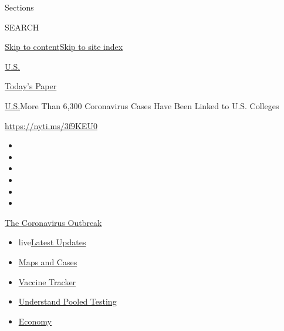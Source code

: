 Sections

SEARCH

\protect\hyperlink{site-content}{Skip to
content}\protect\hyperlink{site-index}{Skip to site index}

\href{https://www.nytimes.com/section/us}{U.S.}

\href{https://myaccount.nytimes.com/auth/login?response_type=cookie\&client_id=vi}{}

\href{https://www.nytimes.com/section/todayspaper}{Today's Paper}

\href{/section/us}{U.S.}\textbar{}More Than 6,300 Coronavirus Cases Have
Been Linked to U.S. Colleges

\url{https://nyti.ms/3f9KEU0}

\begin{itemize}
\item
\item
\item
\item
\item
\item
\end{itemize}

\href{https://www.nytimes.com/news-event/coronavirus?action=click\&pgtype=Article\&state=default\&region=TOP_BANNER\&context=storylines_menu}{The
Coronavirus Outbreak}

\begin{itemize}
\tightlist
\item
  live\href{https://www.nytimes.com/2020/07/29/world/coronavirus-covid-19.html?action=click\&pgtype=Article\&state=default\&region=TOP_BANNER\&context=storylines_menu}{Latest
  Updates}
\item
  \href{https://www.nytimes.com/interactive/2020/us/coronavirus-us-cases.html?action=click\&pgtype=Article\&state=default\&region=TOP_BANNER\&context=storylines_menu}{Maps
  and Cases}
\item
  \href{https://www.nytimes.com/interactive/2020/science/coronavirus-vaccine-tracker.html?action=click\&pgtype=Article\&state=default\&region=TOP_BANNER\&context=storylines_menu}{Vaccine
  Tracker}
\item
  \href{https://www.nytimes.com/interactive/2020/07/27/upshot/coronavirus-pooled-testing.html?action=click\&pgtype=Article\&state=default\&region=TOP_BANNER\&context=storylines_menu}{Understand
  Pooled Testing}
\item
  \href{https://www.nytimes.com/live/2020/07/29/business/stock-market-today-coronavirus?action=click\&pgtype=Article\&state=default\&region=TOP_BANNER\&context=storylines_menu}{Economy}
\end{itemize}

